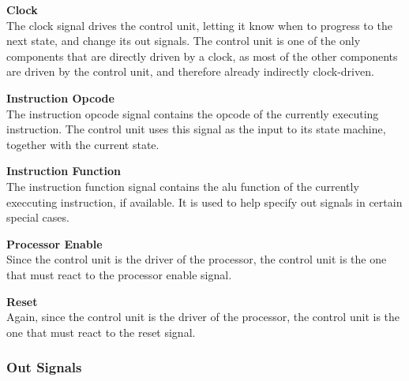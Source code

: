 \begin{description}
\item{\textbf{Clock}} \\
The clock signal drives the control unit, letting it know when to progress to the next state, and change its out signals.
The control unit is one of the only components that are directly driven by a clock, as most of the other components are driven by the control unit, and therefore already indirectly clock-driven.

\item{\textbf{Instruction Opcode}} \\
The instruction opcode signal contains the opcode of the currently executing instruction.
The control unit uses this signal as the input to its state machine, together with the current state.

\item{\textbf{Instruction Function}} \\
The instruction function signal contains the alu function of the currently execcuting instruction, if available.
It is used to help specify out signals in certain special cases.

\item{\textbf{Processor Enable}} \\
Since the control unit is the driver of the processor, the control unit is the one that must react to the processor enable signal.

\item{\textbf{Reset}} \\
Again, since the control unit is the driver of the processor, the control unit is the one that must react to the reset signal.
\end{description}

\subsubsection{Out Signals}

